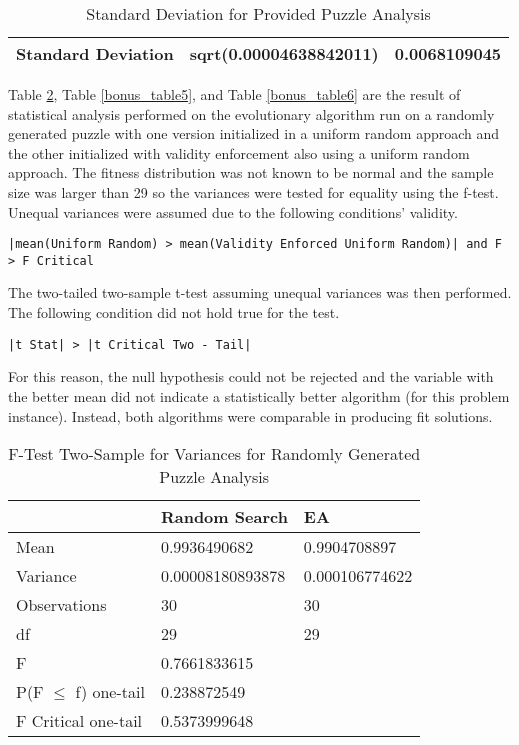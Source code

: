 \documentclass[11pt]{article}
\begin{document}
\begin{table}[H]
\centering
\caption{Standard Deviation for Provided Puzzle Analysis}
\label{bonus_table3}
\begin{tabular}{|l|l|l|}
\hline
Standard Deviation & sqrt(0.00004638842011) & 0.0068109045 \\ \hline
\end{tabular}
\end{table}


Table \ref{bonus_table4}, Table \ref{bonus_table5}, and Table \ref{bonus_table6} are the result of statistical analysis performed on 
the evolutionary algorithm run on a randomly generated puzzle with one version 
initialized in a uniform random approach and the other initialized with validity 
enforcement also using a uniform random approach. The fitness distribution was not 
known to be normal and the sample size was larger than 29 so the variances were 
tested for equality using the f-test. Unequal variances were assumed due to the 
following conditions' validity.

\begin{center}
\texttt{|mean(Uniform Random) > mean(Validity Enforced Uniform Random)| and F > F Critical}
\end{center}

The two-tailed two-sample t-test assuming unequal variances was then performed. The following condition did not hold true for the test.

\begin{center}
\texttt{|t Stat| > |t Critical Two - Tail|}
\end{center}

For this reason, the null hypothesis could not be rejected and the variable with the better mean did not indicate a statistically better algorithm (for this problem instance). Instead, both algorithms were comparable in producing fit solutions.


\begin{table}[H]
\centering
\caption{F-Test Two-Sample for Variances for Randomly Generated Puzzle Analysis}
\label{bonus_table4}
\begin{tabular}{l|l|l}
 & Random Search & EA \\ \hline
Mean & 0.9936490682 & 0.9904708897 \\
Variance & 0.00008180893878 & 0.000106774622 \\
Observations & 30 & 30 \\
df & 29 & 29 \\
F & 0.7661833615 &  \\
P(F $\leq$ f) one-tail & 0.238872549 &  \\
F Critical one-tail & 0.5373999648 & 
\end{tabular}
\end{table}
\end{document}

